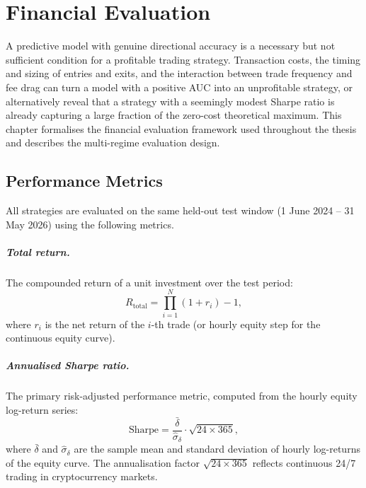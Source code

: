 \chapter{Financial Evaluation}
\label{07_Financial_Evaluation}

A predictive model with genuine directional accuracy is a necessary but not sufficient condition for a profitable trading strategy. Transaction costs, the timing and sizing of entries and exits, and the interaction between trade frequency and fee drag can turn a model with a positive AUC into an unprofitable strategy, or alternatively reveal that a strategy with a seemingly modest Sharpe ratio is already capturing a large fraction of the zero-cost theoretical maximum. This chapter formalises the financial evaluation framework used throughout the thesis and describes the multi-regime evaluation design.

\section{Performance Metrics}
\label{sec:metrics}

All strategies are evaluated on the same held-out test window (1 June 2024 -- 31 May 2026) using the following metrics.

\paragraph{Total return.}
The compounded return of a unit investment over the test period:
\begin{equation}
    R_{\text{total}} = \prod_{i=1}^{N} (1 + r_i) - 1,
\end{equation}
where $r_i$ is the net return of the $i$-th trade (or hourly equity step for the continuous equity curve).

\paragraph{Annualised Sharpe ratio.}
The primary risk-adjusted performance metric, computed from the hourly equity log-return series:
\begin{equation}
    \text{Sharpe} = \frac{\bar{\delta}}{\hat{\sigma}_{\delta}} \cdot \sqrt{24 \times 365},
\end{equation}
where $\bar{\delta}$ and $\hat{\sigma}_{\delta}$ are the sample mean and standard deviation of hourly log-returns of the equity curve. The annualisation factor $\sqrt{24 \times 365}$ reflects continuous 24/7 trading in cryptocurrency markets.

